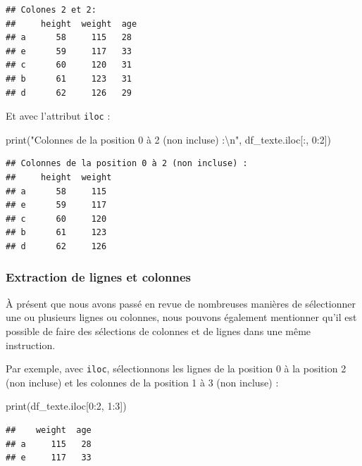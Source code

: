 \documentclass[
  12pt,
]{book}
\newenvironment{Shaded}{\begin{snugshade}}{\end{snugshade}}
\newcommand{\BuiltInTok}[1]{#1}
\newcommand{\CharTok}[1]{\textcolor[rgb]{0.31,0.60,0.02}{#1}}
\newcommand{\DecValTok}[1]{\textcolor[rgb]{0.00,0.00,0.81}{#1}}
\newcommand{\NormalTok}[1]{#1}
\newcommand{\StringTok}[1]{\textcolor[rgb]{0.31,0.60,0.02}{#1}}
\numberwithin{equation}{section}
\numberwithin{countremarque}{section}
\begin{document}
\begin{lstlisting}
## Colones 2 et 2:
##     height  weight  age
## a      58     115   28
## e      59     117   33
## c      60     120   31
## b      61     123   31
## d      62     126   29
\end{lstlisting}

Et avec l'attribut \texttt{iloc} :

\begin{Shaded}
\begin{Highlighting}[]
\BuiltInTok{print}\NormalTok{(}\StringTok{"Colonnes de la position 0 à 2 (non incluse) :}\CharTok{\textbackslash{}n}\StringTok{"}\NormalTok{, }
\NormalTok{      df\_texte.iloc[:, }\DecValTok{0}\NormalTok{:}\DecValTok{2}\NormalTok{])}
\end{Highlighting}
\end{Shaded}

\begin{lstlisting}
## Colonnes de la position 0 à 2 (non incluse) :
##     height  weight
## a      58     115
## e      59     117
## c      60     120
## b      61     123
## d      62     126
\end{lstlisting}

\subsubsection{Extraction de lignes et colonnes}\label{extraction-de-lignes-et-colonnes}

À présent que nous avons passé en revue de nombreuses manières de sélectionner une ou plusieurs lignes ou colonnes, nous pouvons également mentionner qu'il est possible de faire des sélections de colonnes et de lignes dans une même instruction.

Par exemple, avec \texttt{iloc}, sélectionnons les lignes de la position 0 à la position 2 (non incluse) et les colonnes de la position 1 à 3 (non incluse) :

\begin{Shaded}
\begin{Highlighting}[]
\BuiltInTok{print}\NormalTok{(df\_texte.iloc[}\DecValTok{0}\NormalTok{:}\DecValTok{2}\NormalTok{, }\DecValTok{1}\NormalTok{:}\DecValTok{3}\NormalTok{])}
\end{Highlighting}
\end{Shaded}

\begin{lstlisting}
##    weight  age
## a     115   28
## e     117   33
\end{lstlisting}
\end{document}
